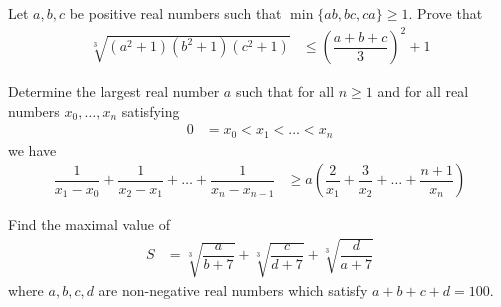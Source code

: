 \documentclass{subfile}
\begin{document}
		\begin{problem}
			Let $a,b,c$ be positive real numbers such that $\min\{ab,bc,ca\}\geq1$. Prove that
				\begin{align*}
					\sqrt[3]{(a^2+1)(b^2+1)(c^2+1)}
						& \leq\left(\dfrac{a+b+c}{3}\right)^2+1
				\end{align*}
		\end{problem}
	
		\begin{problem}
			Determine the largest real number $a$ such that for all $n\geq1$ and for all real numbers $x_{0},\ldots,x_{n}$ satisfying
				\begin{align*}
					0
						& = x_{0}<x_{1}<\ldots<x_{n}
				\end{align*}
			we have
				\begin{align*}
					\dfrac{1}{x_{1}-x_{0}}+\dfrac{1}{x_{2}-x_{1}}+\ldots+\dfrac{1}{x_{n}-x_{n-1}}
						& \geq a\left(\dfrac{2}{x_{1}}+\dfrac{3}{x_{2}}+\ldots+\dfrac{n+1}{x_{n}}\right)
				\end{align*}
		\end{problem}
	
		\begin{problem}
			Find the maximal value of
				\begin{align*}
					S
						& = \sqrt[3]{\dfrac{a}{b+7}}+\sqrt[3]{\dfrac{c}{d+7}}+\sqrt[3]{\dfrac{d}{a+7}}
				\end{align*}
			where $a,b,c,d$ are non-negative real numbers which satisfy $a+b+c+d=100$.
		\end{problem}
\end{document}
